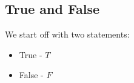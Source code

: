 \subsection{True and False}

We start off with two statements:

\begin{itemize}
\item True - \(T\)
\item False - \(F\)
\end{itemize}


